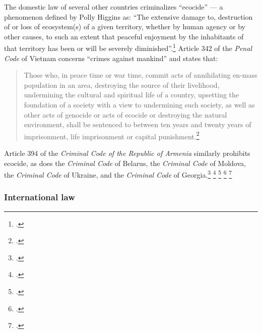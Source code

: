 \documentclass[10pt]{article}
\begin{document}
The domestic law of several other countries criminalizes ``ecocide'' --- a phenomenon defined by Polly Higgins as: ``The extensive damage to, destruction of or loss of ecosystem(s) of a given territory, whether by human agency or by other causes, to such an extent that peaceful enjoyment by the inhabitants of that territory has been or will be severely diminished''.\footcite[][]{EradicatingEcocide}
Article 342 of the \emph{Penal Code} of Vietnam concerns ``crimes against mankind'' and states that:
\begin{quote}
Those who, in peace time or war time, commit acts of annihilating en-mass population in an area, destroying the source of their livelihood, undermining the cultural and spiritual life of a country, upsetting the foundation of a society with a view to undermining such society, as well as other acts of genocide or acts of ecocide or destroying the natural environment, shall be sentenced to between ten years and twenty years of imprisonment, life imprisonment or capital punishment.\footcite[][]{VietnamPenalCode}
\end{quote}
Article 394 of the \emph{Criminal Code of the Republic of Armenia} similarly prohibits ecocide, as does the \emph{Criminal Code} of Belarus, the \emph{Criminal Code} of Moldova, the \emph{Criminal Code} of Ukraine, and the \emph{Criminal Code} of Georgia.\footcite[][]{ArmeniaCriminalCode} \footcite[][]{ICRConBelarusCC} \footcite[][]{MoldovaCriminal} \footcite[][]{UkraineCriminal} \footcite[][]{GeorgiaCriminal}



		\subsubsection{International law}
\end{document}
